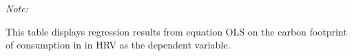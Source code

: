 \begin{table}[htbp!]
\begin{adjustbox}{width = 1\textwidth, max height = 0.95\textheight, center}
\begin{threeparttable}[b]
         \begin{tablenotes}\item \medskip \textit{Note:}
            \item This table displays regression results from equation OLS on the carbon footprint of consumption in  in HRV as the dependent variable.  
         \end{tablenotes}
      \end{threeparttable}
   \end{adjustbox}
\end{table}


